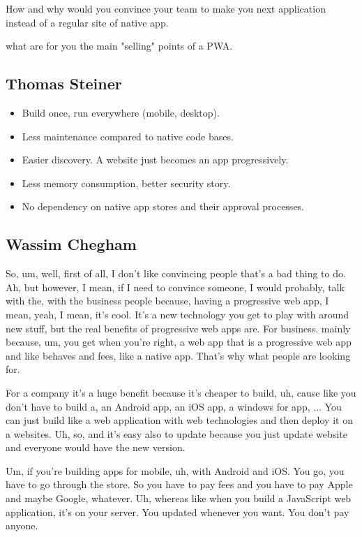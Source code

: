 		How and why would you convince your team to make you next application instead of a regular site of native app.
		
		what are for you the main "selling" points of a PWA.
		
		\subsection{Thomas Steiner}
			\begin{itemize}
				\item Build once, run everywhere (mobile, desktop).
				\item Less maintenance compared to native code bases.
				\item Easier discovery. A website just becomes an app progressively.
				\item Less memory consumption, better security story.
				\item No dependency on native app stores and their approval processes.

			\end{itemize} 
	
		\subsection{Wassim Chegham}
			So, um, well, first of all, I don't like convincing people that's a bad thing to do. Ah, but however, I mean, if I need to convince someone, I would probably, talk with the, with the business people because, having a progressive web app, I mean, yeah, I mean, it's cool. It's a new technology you get to play with around new stuff, but the real benefits of progressive web apps are. For business. mainly because, um, you get when you're right, a web app that is a progressive web app and like behaves and fees, like a native app. That's why what people are looking for.
			
			For a company it's a huge benefit because it's cheaper to build, uh, cause like you don't have to build a, an Android app, an iOS app, a windows for app, ... You can just build like a web application with web technologies and then deploy it on a websites. Uh, so, and it's easy also to update because you just update website and everyone would have the new version.
			
			Um, if you're building apps for mobile, uh, with Android and iOS. You go, you have to go through the store. So you have to pay fees and you have to pay Apple and maybe Google, whatever. Uh, whereas like when you build a JavaScript web application, it's on your server. You updated whenever you want. You don't pay anyone. 
			

